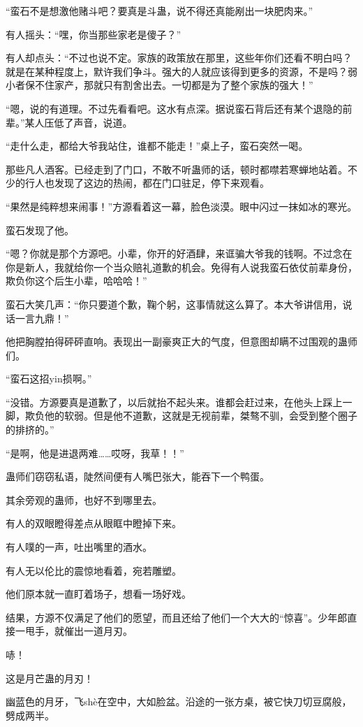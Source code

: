 \begin{this_body}
“蛮石不是想激他赌斗吧？要真是斗蛊，说不得还真能剐出一块肥肉来。”

有人摇头：“嘿，你当那些家老是傻子？”

有人却点头：“不过也说不定。家族的政策放在那里，这些年你们还看不明白吗？就是在某种程度上，默许我们争斗。强大的人就应该得到更多的资源，不是吗？弱小者保不住家产，那就只有割舍出去。一切都是为了整个家族的强大！”

“嗯，说的有道理。不过先看看吧。这水有点深。据说蛮石背后还有某个退隐的前辈。”某人压低了声音，说道。

“走什么走，都给大爷我站住，谁都不能走！”桌上子，蛮石突然一喝。

那些凡人酒客。已经走到了门口，不敢不听蛊师的话，顿时都噤若寒蝉地站着。不少的行人也发现了这边的热闹，都在门口驻足，停下来观看。

“果然是纯粹想来闹事！”方源看着这一幕，脸色淡漠。眼中闪过一抹如冰的寒光。

蛮石发现了他。

“嗯？你就是那个方源吧。小辈，你开的好酒肆，来诓骗大爷我的钱啊。不过念在你是新人，我就给你一个当众赔礼道歉的机会。免得有人说我蛮石依仗前辈身份，欺负你这个后生小辈，哈哈哈！”

蛮石大笑几声：“你只要道个歉，鞠个躬，这事情就这么算了。本大爷讲信用，说话一言九鼎！”

他把胸膛拍得砰砰直响。表现出一副豪爽正大的气度，但意图却瞒不过围观的蛊师们。

“蛮石这招yin损啊。”

“没错。方源要真是道歉了，以后就抬不起头来。谁都会赶过来，在他头上踩上一脚，欺负他的软弱。但是他不道歉，这就是无视前辈，桀骜不驯，会受到整个圈子的排挤的。”

“是啊，他是进退两难……哎呀，我草！！”

蛊师们窃窃私语，陡然间便有人嘴巴张大，能吞下一个鸭蛋。

其余旁观的蛊师，也好不到哪里去。

有人的双眼瞪得差点从眼眶中瞪掉下来。

有人噗的一声，吐出嘴里的酒水。

有人无以伦比的震惊地看着，宛若雕塑。

他们原本就一直盯着场子，想看一场好戏。

结果，方源不仅满足了他们的愿望，而且还给了他们一个大大的“惊喜”。少年郎直接一甩手，就催出一道月刃。

哧！

这是月芒蛊的月刃！

幽蓝色的月牙，飞shè在空中，大如脸盆。沿途的一张方桌，被它快刀切豆腐般，劈成两半。


\end{this_body}
